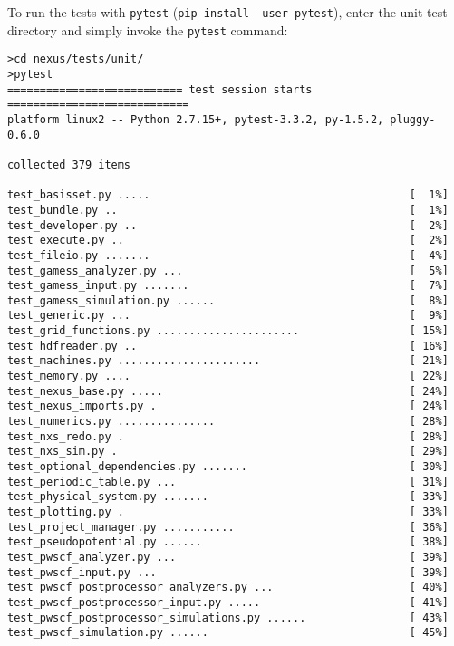 \documentclass[oneside,11pt]{memoir}
\numberwithin{equation}{section}
\begin{document}
To run the tests with \texttt{pytest} (\texttt{pip install --user pytest}), enter the unit test directory and simply invoke the \texttt{pytest} command:
\begin{shaded}
\begin{verbatim}
>cd nexus/tests/unit/
>pytest
=========================== test session starts ============================
platform linux2 -- Python 2.7.15+, pytest-3.3.2, py-1.5.2, pluggy-0.6.0

collected 379 items                                                 

test_basisset.py .....                                        [  1%]
test_bundle.py ..                                             [  1%]
test_developer.py ..                                          [  2%]
test_execute.py ..                                            [  2%]
test_fileio.py .......                                        [  4%]
test_gamess_analyzer.py ...                                   [  5%]
test_gamess_input.py .......                                  [  7%]
test_gamess_simulation.py ......                              [  8%]
test_generic.py ...                                           [  9%]
test_grid_functions.py ......................                 [ 15%]
test_hdfreader.py ..                                          [ 16%]
test_machines.py ......................                       [ 21%]
test_memory.py ....                                           [ 22%]
test_nexus_base.py .....                                      [ 24%]
test_nexus_imports.py .                                       [ 24%]
test_numerics.py ...............                              [ 28%]
test_nxs_redo.py .                                            [ 28%]
test_nxs_sim.py .                                             [ 29%]
test_optional_dependencies.py .......                         [ 30%]
test_periodic_table.py ...                                    [ 31%]
test_physical_system.py .......                               [ 33%]
test_plotting.py .                                            [ 33%]
test_project_manager.py ...........                           [ 36%]
test_pseudopotential.py ......                                [ 38%]
test_pwscf_analyzer.py ...                                    [ 39%]
test_pwscf_input.py ...                                       [ 39%]
test_pwscf_postprocessor_analyzers.py ...                     [ 40%]
test_pwscf_postprocessor_input.py .....                       [ 41%]
test_pwscf_postprocessor_simulations.py ......                [ 43%]
test_pwscf_simulation.py ......                               [ 45%]

\end{verbatim}
\end{shaded}
\end{document}
